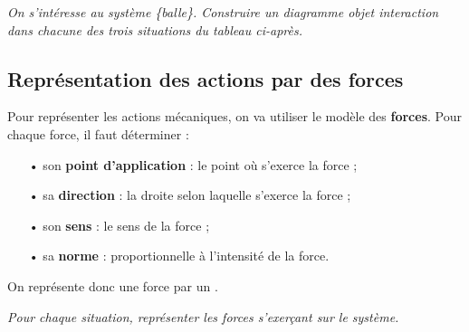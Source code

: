 \documentclass[12pt,a4paper,fleqn]{article}
\begin{document}
\emph{On s'intéresse au système \{balle\}.
Construire un diagramme objet interaction dans chacune des trois situations du tableau ci-après.}

\subsection{Représentation des actions par des forces}

Pour représenter les actions mécaniques, on va utiliser le modèle des \textbf{forces}.
Pour chaque force, il faut déterminer :
\begin{itemize}
\item[•] son \textbf{point d'application}  :  le point où s'exerce la force ;
\item[•] sa \textbf{direction} : la droite selon laquelle s'exerce la force ;
\item[•] son \textbf{sens} : le sens de la force ;
\item[•] sa \textbf{norme} : proportionnelle à l'intensité de la force. 
\end{itemize}
On représente donc une force par un .

\emph{Pour chaque situation, représenter les forces s'exerçant sur le système.}

\newpage
\end{document}
